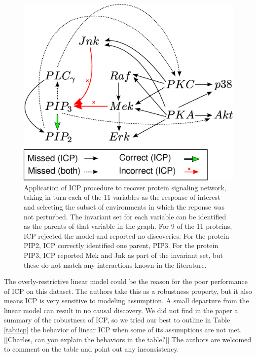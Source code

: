 \documentclass{article}
\begin{document}
\begin{figure}[t]
\centering
\includegraphics[scale = 0.3]{drawing2legend.eps}
\caption{Application of ICP procedure to recover protein signaling network,
taking in turn each of the 11 variables as the response of interest
and selecting the subset of environments in which the reponse was not
perturbed.  The invariant set for each variable can be identified as
the parents of that variable in the graph.  For 9 of the 11 proteins,
ICP rejected the model and reported no discoveries.  For the protein
PIP2, ICP correctly identified one parent, PIP3.  For the protein
PIP3, ICP reported Mek and Jnk as part of the invariant set, but these
do not match any interactions known in the literature.}
\label{fig:sachs}
\end{figure}

The overly-restrictive linear model could be the reason for the poor
performance of ICP on this dataset. The authors take this as a
robustness property, but it also means ICP is very sensitive to
modeling assumption. A small departure from the linear
model can result in no causal discovery. We did not find in the paper a
summary of the robustness of ICP, so we tried our best to outline in
Table \ref{tab:icp} the behavior of linear ICP when some of its
assumptions are not met. [[Charles, can you explain the
{\color{red} behaviors} in the table?]] The authors are welcomed to
comment on the table and point out any inconsistency.
\end{document}
